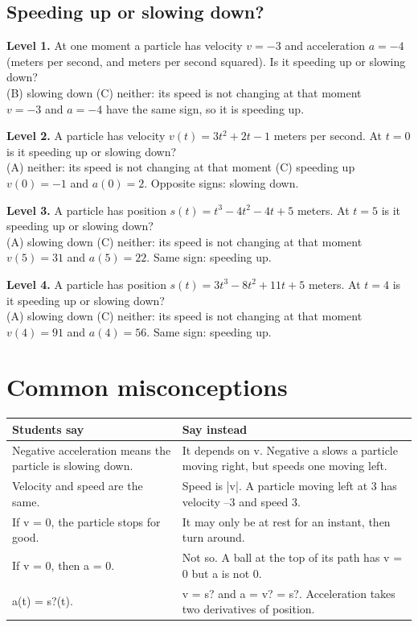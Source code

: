 \documentclass[11pt]{article}
\begin{document}
\subsection*{Speeding up or slowing down?}
\noindent\textbf{Level 1.} At one moment a particle has velocity $v=-3$ and acceleration $a=-4$ (meters per second, and meters per second squared). Is it speeding up or slowing down?\\  \quad (B) slowing down \quad (C) neither: its speed is not changing at that moment\\  \quad $v=-3$ and $a=-4$ have the same sign, so it is speeding up.\par\medskip
\noindent\textbf{Level 2.} A particle has velocity $v(t)=3t^{2}+2t-1$ meters per second. At $t=0$ is it speeding up or slowing down?\\ (A) neither: its speed is not changing at that moment \quad {} \quad (C) speeding up\\  \quad $v(0)=-1$ and $a(0)=2$. Opposite signs: slowing down.\par\medskip
\noindent\textbf{Level 3.} A particle has position $s(t)=t^{3}-4t^{2}-4t+5$ meters. At $t=5$ is it speeding up or slowing down?\\ (A) slowing down \quad {} \quad (C) neither: its speed is not changing at that moment\\  \quad $v(5)=31$ and $a(5)=22$. Same sign: speeding up.\par\medskip
\noindent\textbf{Level 4.} A particle has position $s(t)=3t^{3}-8t^{2}+11t+5$ meters. At $t=4$ is it speeding up or slowing down?\\ (A) slowing down \quad {} \quad (C) neither: its speed is not changing at that moment\\  \quad $v(4)=91$ and $a(4)=56$. Same sign: speeding up.\par\medskip
\section*{Common misconceptions}\begin{tabularx}{\textwidth}{@{}X X@{}}\toprule Students say & Say instead\\\midrule
Negative acceleration means the particle is slowing down. & It depends on v. Negative a slows a particle moving right, but speeds one moving left.\\
Velocity and speed are the same. & Speed is |v|. A particle moving left at 3 has velocity --3 and speed 3.\\
If v = 0, the particle stops for good. & It may only be at rest for an instant, then turn around.\\
If v = 0, then a = 0. & Not so. A ball at the top of its path has v = 0 but a is not 0.\\
a(t) = s?(t). & v = s? and a = v? = s?. Acceleration takes two derivatives of position.\\
\bottomrule\end{tabularx}
\end{document}
